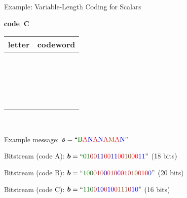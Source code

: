 \begin{frame}{Example: Variable-Length Coding for Scalars}
{\begin{minipage}{0.32\linewidth}
{\begin{center}
      {\bf code~C}\\[.5ex]
      \begin{tabular}{|c|l|}
        \hline
    \color{black}letter & \color{black}codeword\\
    \hline\rule{0ex}{2.5ex}%
    \color{red}{A}         & ~~~\color{red}{0}\\
    \color{officegreen}{B} & ~~~\color{officegreen}{110}\\
    \color{saddlebrown}{M} & ~~~\color{saddlebrown}{111}\\
    \color{blue}{N}        & ~~~\color{blue}{10}\\
        \hline
    \end{tabular}
    \end{center}}
  \end{minipage}\\[4ex]
  }
\item<3-> Example message: \tab$\ve{s}=\text{``{\color{officegreen}{B}\color{red}{A}\color{blue}{N}\color{red}{A}\color{blue}{N}\color{red}{A}\color{saddlebrown}{M}\color{red}{A}\color{blue}{N}}''}$
\item<4->[\iarrow] Bitstream (code A): \tab$\ve{b}=\text{``{\color{officegreen}{01}\color{red}{00}\color{blue}{11}\color{red}{00}\color{blue}{11}\color{red}{00}\color{saddlebrown}{10}\color{red}{00}\color{blue}{11}}''}$
  \tab(18 bits)
  \item<6->[\iarrow] Bitstream (code B): \tab$\ve{b}=\text{``{\color{officegreen}{100}\color{red}{010}\color{blue}{0}\color{red}{010}\color{blue}{0}\color{red}{010}\color{saddlebrown}{10}\color{red}{010}\color{blue}{0}}''}$
  \tab(20 bits)
  \item<8->[\iarrow] Bitstream (code C): \tab$\ve{b}=\text{``{\color{officegreen}{110}\color{red}{0}\color{blue}{10}\color{red}{0}\color{blue}{10}\color{red}{0}\color{saddlebrown}{111}\color{red}{0}\color{blue}{10}}''}$
    \tab(16 bits)
  \eit\vspace{-10ex}
  \end{frame}


